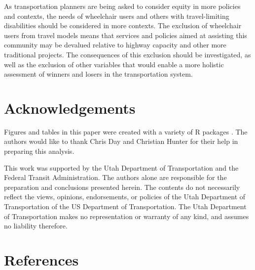 \documentclass[3p, authoryear, review]{elsarticle} %
\begin{document}
As transportation planners are being asked to consider equity in more policies
and contexts, the needs of wheelchair users and others with travel-limiting
disabilities should be considered in more contexts. The exclusion of wheelchair
users from travel models means that services and policies aimed at assisting
this community may be devalued relative to highway capacity and other more
traditional projects. The consequences of this exclusion should be investigated,
as well as the exclusion of other variables that would enable a more holistic
assessment of winners and losers in the transportation system.

\hypertarget{acks}{%
\section*{Acknowledgements}\label{acks}}

Figures and tables in this paper were created with a variety of R
packages \citep{R-ggplot2, R-modelsummary, R-ggspatial}. The authors would like to thank
Chris Day and Christian Hunter for their help in preparing this analysis.

This work was supported by the Utah Department of Transportation and the
Federal Transit Administration. The authors alone are responsible for the
preparation and conclusions presented herein. The contents do not necessarily
reflect the views, opinions, endorsements, or policies of the Utah Department of
Transportation of the US Department of Transportation. The Utah Department of
Transportation makes no representation or warranty of any kind, and assumes no
liability therefore.

\hypertarget{references}{%
\section*{References}\label{references}}


\end{document}
